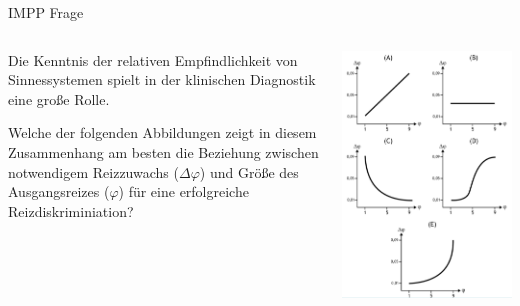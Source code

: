 \documentclass{beamer}
\begin{document}
\begin{frame}{IMPP Frage}


\begin{columns}[c]
\begin{column}{6cm}
Die Kenntnis der relativen Empfindlichkeit von Sinnessystemen spielt in der klinischen Diagnostik eine große Rolle. 

Welche der folgenden Abbildungen zeigt in diesem Zusammenhang am besten die Beziehung zwischen notwendigem Reizzuwachs (\( \Delta \varphi \)) und Größe des Ausgangsreizes (\(\varphi\)) für eine erfolgreiche Reizdiskriminiation? 


\end{column}


\begin{column}{5cm}
\begin{center}
    \includegraphics[width=\textwidth]{weber_IMPP.png}
\end{center}
\end{column}

\end{columns}
    
\end{frame}
\end{document}
